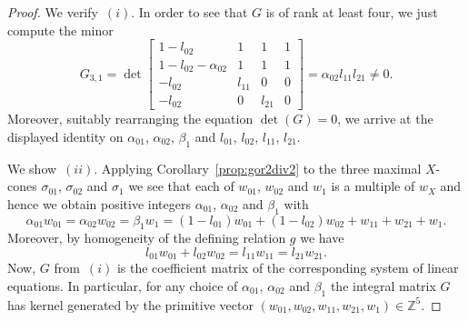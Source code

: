 \documentclass[10pt,a4paper]{amsart}
\theoremstyle{definition}
\def\ZZ{{\mathbb Z}}
\numberwithin{equation}{section}
\begin{document}
\begin{proof}
We verify~$(i)$. In order to see that $G$ is of rank at least
four, we just compute the minor
\[
G_{3,1} =\det
\begin{bmatrix}
1-l_{02} & 1 & 1 & 1
\\
1-l_{02}-\alpha_{02} & 1 & 1 & 1
\\
-l_{02} & l_{11} & 0 & 0
\\
-l_{02} & 0 & l_{21} & 0
\end{bmatrix}
 =\alpha_{02} l_{11}l_{21} \ne 0.
\]
Moreover, suitably rearranging the equation
$\det(G) = 0$, we arrive at the displayed identity on
$\alpha_{01}$, $\alpha_{02}$, $\beta_1$ and
$l_{01}$, $l_{02}$, $l_{11}$, $l_{21}$.

We show~$(ii)$.
Applying Corollary~\ref{prop:gor2div2} to the
three maximal $X$-cones $\sigma_{01}$, $\sigma_{02}$
and $\sigma_1$ we see that each of $w_{01}$, $w_{02}$ and $w_1$
is a multiple of $w_X$ and hence we obtain
positive integers $\alpha_{01}$, $\alpha_{02}$ and $\beta_1$
with
\begin{equation*}
\alpha_{01} w_{01}
 =
\alpha_{02} w_{02}
 =
\beta_1 w_1
 =
(1-l_{01}) w_{01} + (1-l_{02}) w_{02} + w_{11} + w_{21} + w_1.
\end{equation*}
Moreover, by homogeneity of the defining relation
$g$ we have
\begin{equation*}
l_{01} w_{01} + l_{02}w_{02} =l_{11} w_{11} =l_{21} w_{21}.
\end{equation*}
Now, $G$ from~$(i)$ is the coefficient matrix of
the corresponding system of linear equations.
In particular, for any choice of
$\alpha_{01}$, $\alpha_{02}$ and $\beta_1$
the integral matrix $G$ has kernel generated by
the primitive vector
$(w_{01},w_{02},w_{11},w_{21},w_1) \in \ZZ^5$.


\end{proof}
\end{document}
